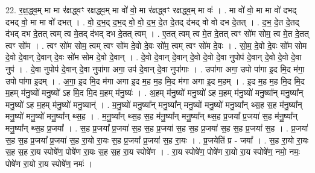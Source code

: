 \documentclass[17pt]{extarticle}
\begin{document}
22. र॒क्ष॒द्ध्व॒म् मा मा र॑क्षद्ध्वꣳ रक्षद्ध्व॒म् मा वो॑ वो॒ मा र॑क्षद्ध्वꣳ रक्षद्ध्व॒म् मा वः॑ । . मा वो॑ वो॒ मा मा वो॑ दभद् दभद् वो॒ मा मा वो॑ दभत् । . वो॒ द॒भ॒द् द॒भ॒द् वो॒ वो॒ द॒भ॒ दे॒त दे॒तद् द॑भद् वो वो दभ दे॒तत् । . द॒भ॒ दे॒त दे॒तद् द॑भद् दभ दे॒तत् त्वम् त्व मे॒तद् द॑भद् दभ दे॒तत् त्वम् । . ए॒तत् त्वम् त्व मे॒त दे॒तत् त्वꣳ सो॑म सोम॒ त्व मे॒त दे॒तत् त्वꣳ सो॑म । . त्वꣳ सो॑म सोम॒ त्वम् त्वꣳ सो॑म दे॒वो दे॒वः सो॑म॒ त्वम् त्वꣳ सो॑म दे॒वः । . सो॒म॒ दे॒वो दे॒वः सो॑म सोम दे॒वो दे॒वान् दे॒वान् दे॒वः सो॑म सोम दे॒वो दे॒वान् । . दे॒वो दे॒वान् दे॒वान् दे॒वो दे॒वो दे॒वा नुपोप॑ दे॒वान् दे॒वो दे॒वो दे॒वा नुप॑ । . दे॒वा नुपोप॑ दे॒वान् दे॒वा नुपा॑गा अगा॒ उप॑ दे॒वान् दे॒वा नुपा॑गाः । . उपा॑गा अगा॒ उपो पा॑गा इ॒द मि॒द म॑गा॒ उपो पा॑गा इ॒दम् । . अ॒गा॒ इ॒द मि॒द म॑गा अगा इ॒द म॒ह म॒ह मि॒द म॑गा अगा इ॒द म॒हम् । . इ॒द म॒ह म॒ह मि॒द मि॒द म॒हम् म॑नु॒ष्यो॑ मनु॒ष्यो॑ ऽह मि॒द मि॒द म॒हम् म॑नु॒ष्यः॑ । . अ॒हम् म॑नु॒ष्यो॑ मनु॒ष्यो॑ ऽह म॒हम् म॑नु॒ष्यो॑ मनु॒ष्या᳚न् मनु॒ष्या᳚न् मनु॒ष्यो॑ ऽह म॒हम् म॑नु॒ष्यो॑ मनु॒ष्यान्॑ । . म॒नु॒ष्यो॑ मनु॒ष्या᳚न् मनु॒ष्या᳚न् मनु॒ष्यो॑ मनु॒ष्यो॑ मनु॒ष्या᳚न् थ्स॒ह स॒ह म॑नु॒ष्या᳚न् मनु॒ष्यो॑ मनु॒ष्यो॑ मनु॒ष्या᳚न् थ्स॒ह । . म॒नु॒ष्या᳚न् थ्स॒ह स॒ह म॑नु॒ष्या᳚न् मनु॒ष्या᳚न् थ्स॒ह प्र॒जया᳚ प्र॒जया॑ स॒ह म॑नु॒ष्या᳚न् मनु॒ष्या᳚न् थ्स॒ह प्र॒जया᳚ । . स॒ह प्र॒जया᳚ प्र॒जया॑ स॒ह स॒ह प्र॒जया॑ स॒ह स॒ह प्र॒जया॑ स॒ह स॒ह प्र॒जया॑ स॒ह । . प्र॒जया॑ स॒ह स॒ह प्र॒जया᳚ प्र॒जया॑ स॒ह रा॒यो रा॒यः स॒ह प्र॒जया᳚ प्र॒जया॑ स॒ह रा॒यः । . प्र॒जयेति॑ प्र - जया᳚ । . स॒ह रा॒यो रा॒यः स॒ह स॒ह रा॒य स्पोषे॑ण॒ पोषे॑ण रा॒यः स॒ह स॒ह रा॒य स्पोषे॑ण । . रा॒य स्पोषे॑ण॒ पोषे॑ण रा॒यो रा॒य स्पोषे॑ण॒ नमो॒ नमः॒ पोषे॑ण रा॒यो रा॒य स्पोषे॑ण॒ नमः॑ । \newline
\end{document}
